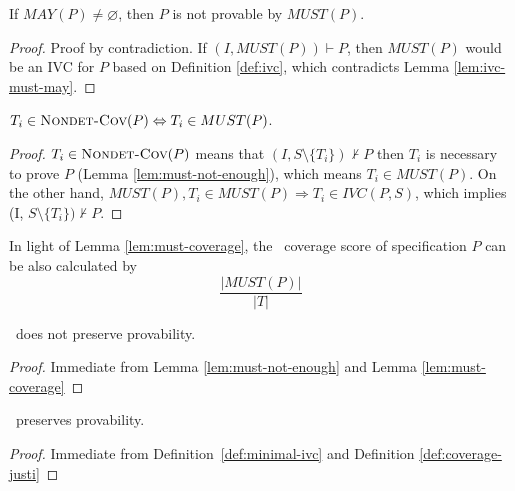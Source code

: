 \begin{lemma}
  \label{lem:must-not-enough}
  If $MAY(P) \neq \varnothing$, then $P$ is not provable by $MUST(P)$.
\end{lemma}
\begin{proof}
  Proof by contradiction. If $(I, MUST(P)) \vdash P$, then $MUST(P)$
  would be an IVC for $P$ based on Definition \ref{def:ivc},
  which contradicts Lemma \ref{lem:ivc-must-may}.
\end{proof}
\vspace{2mm}

\begin{lemma}
  \label{lem:must-coverage}
$T_i \in \text{\sc Nondet-Cov} (P) \Leftrightarrow T_i \in MUST(P)$.
\end{lemma}
\begin{proof}
$T_i \in \text{\sc Nondet-Cov} (P)$ means that $(I, S \setminus \{ T_i \}) \nvdash P$ then $T_i$ is necessary to prove $P$ (Lemma \ref{lem:must-not-enough}), which means $T_i \in MUST(P)$.
On the other hand, $MUST(P), T_i \in MUST (P) \Rightarrow T_i \in IVC(P, S)$,
which implies (I, $S \setminus \{ T_i \}) \nvdash P$.
\end{proof}
\vspace{2mm}

In light of Lemma \ref{lem:must-coverage}, the \nondetcov\ coverage score of specification $P$ can be also calculated by
$$\frac{|MUST(P)|}{|T|}$$
\vspace{0.2in}


%
\begin{coroll}
\label{cor:must-not-provable}
\nondetcov\ does not preserve provability.
\end{coroll}
\begin{proof}
Immediate from Lemma \ref{lem:must-not-enough} and Lemma \ref{lem:must-coverage}
\end{proof}
\vspace{2mm}
\begin{coroll}
\label{cor:ivc-provable}
\ivccov\ preserves provability.
\end{coroll}
\begin{proof}
Immediate from Definition~\ref{def:minimal-ivc} and Definition \ref{def:coverage-justi}
\end{proof}
\vspace{2mm}


